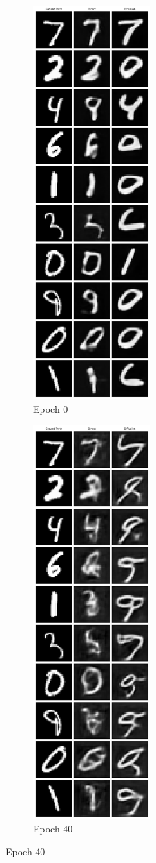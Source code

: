 \documentclass[12pt]{article}
\begin{document}
\begin{figure}[hp]
    \begin{subfigure}{0.49\textwidth}
    \includegraphics[width=0.9\linewidth, height=15cm, center]{figures/gt_direct_diffusion_9.png}
    \caption{Epoch 0}
    \label{fig:gt_direct_9}
    \end{subfigure}
    \begin{subfigure}{0.49\textwidth}
    \includegraphics[width=0.9\linewidth, height=15cm, center]{figures/gt_direct_diffusion_10.png}
    \caption{Epoch 40}
    \label{fig:gt_direct_10}
    \end{subfigure}


\end{figure}
\end{document}
